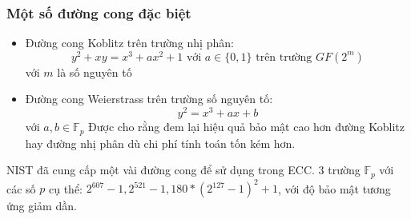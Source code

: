 \documentclass [xcolor=svgnames, t] {beamer}
\theoremstyle{definition}
\begin{document}
\begin{frame}
    \frametitle{Một số đường cong đặc biệt}
    \begin{itemize}
        \item Đường cong Koblitz trên trường nhị phân:
              $$ y^2 + xy = x^3 + ax^2 + 1 \text{ với } a \in \{0,1\} \text{ trên trường $GF(2^m)$} $$ với $m$ là số nguyên tố
        \item Đường cong Weierstrass trên trường số nguyên tố:
              $$ y^2 = x^3 + ax + b$$ với $a,b \in \mathbb{F}_p$
              Được cho rằng đem lại hiệu quả bảo mật cao hơn đường Koblitz hay đường nhị phân dù chi phí tính toán tốn kém hơn.
    \end{itemize}

    NIST đã cung cấp một vài đường cong để sử dụng trong ECC. 3 trường $\mathbb{F}_p$ với các số $p$ cụ thể: $2^{607}-1, 2^{521}-1, 180*(2^{127}-1)^2+1$, với độ bảo mật tương ứng giảm dần.

\end{frame}
\end{document}
